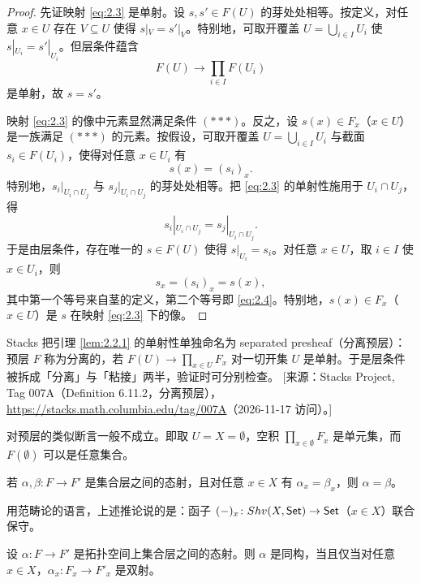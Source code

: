 \begin{proof}
先证映射 \eqref{eq:2.3} 是单射。设 $s,s'\in F(U)$ 的芽处处相等。按定义，对任意 $x\in U$ 存在 $V\subseteq U$ 使得 $s|_V=s'|_V$。特别地，可取开覆盖 $U=\bigcup_{i\in I}U_i$ 使 $s|_{U_i}=s'|_{U_i}$。但层条件蕴含
\[
F(U)\to\prod_{i\in I}F(U_i)
\]
是单射，故 $s=s'$。

映射 \eqref{eq:2.3} 的像中元素显然满足条件 $(***)$。反之，设 $s(x)\in F_x$（$x\in U$）是一族满足 $(***)$ 的元素。按假设，可取开覆盖 $U=\bigcup_{i\in I}U_i$ 与截面 $s_i\in F(U_i)$，使得对任意 $x\in U_i$ 有
\begin{equation}\tag{2.4}\label{eq:2.4}
s(x)=(s_i)_x.
\end{equation}
特别地，$s_i|_{U_i\cap U_j}$ 与 $s_j|_{U_i\cap U_j}$ 的芽处处相等。把 \eqref{eq:2.3} 的单射性施用于 $U_i\cap U_j$，得
\[
s_i|_{U_i\cap U_j}=s_j|_{U_i\cap U_j}.
\]
于是由层条件，存在唯一的 $s\in F(U)$ 使得 $s|_{U_i}=s_i$。对任意 $x\in U$，取 $i\in I$ 使 $x\in U_i$，则
\[
s_x=(s_i)_x=s(x),
\]
其中第一个等号来自茎的定义，第二个等号即 \eqref{eq:2.4}。特别地，$s(x)\in F_x$（$x\in U$）是 $s$ 在映射 \eqref{eq:2.3} 下的像。
\end{proof}

\begin{yizhu}
Stacks 把引理 \ref{lem:2.2.1} 的单射性单独命名为 separated presheaf（分离预层）：预层 $F$ 称为分离的，若 $F(U)\to\prod_{x\in U}F_x$ 对一切开集 $U$ 是单射。于是层条件被拆成「分离」与「粘接」两半，验证时可分别检查。
[来源：Stacks Project, Tag 007A（Definition 6.11.2，分离预层），\url{https://stacks.math.columbia.edu/tag/007A}（2026-11-17 访问）。]
\end{yizhu}

\begin{remark}\label{rem:2.2.2}
对预层的类似断言一般不成立。即取 $U=X=\emptyset$，空积 $\prod_{x\in\emptyset}F_x$ 是单元集，而 $F(\emptyset)$ 可以是任意集合。
\end{remark}

\begin{corollary}\label{cor:2.2.3}
若 $\alpha,\beta\colon F\to F'$ 是集合层之间的态射，且对任意 $x\in X$ 有 $\alpha_x=\beta_x$，则 $\alpha=\beta$。
\end{corollary}

\begin{remark}\label{rem:2.2.4}
用范畴论的语言，上述推论说的是：函子 $(-)_x\colon Shv(X,\mathsf{Set})\to\mathsf{Set}$（$x\in X$）联合保守。
\end{remark}

\begin{proposition}\label{prop:2.2.5}
设 $\alpha\colon F\to F'$ 是拓扑空间上集合层之间的态射。则 $\alpha$ 是同构，当且仅当对任意 $x\in X$，$\alpha_x\colon F_x\to F'_x$ 是双射。
\end{proposition}


